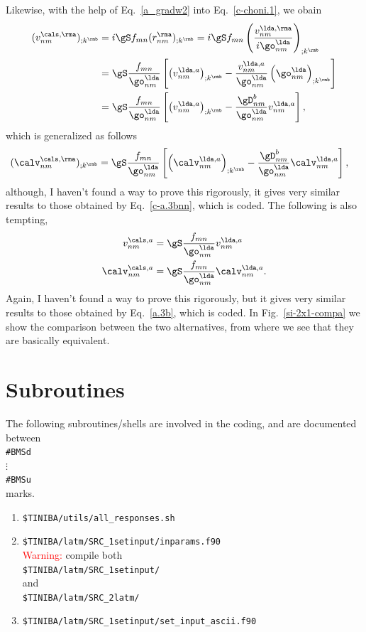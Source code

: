 Likewise, with the help
of Eq.~\eqref{a_gradw2} into
Eq.~\eqref{c-choni.1}, we obain
\begin{align}\label{ccu54}
(v^{\cals,\rma}_{nm})_{;k^\rmb}&=
i\gS f_{mn}(r^\rma_{nm})_{;k^\rmb}
=
i\gS f_{mn}\left(\frac{v^{\lda,\rma}_{nm}}{i\go^\lda_{nm}}\right)_{;k^\rmb}
\nonumber\\
&=
\gS\frac{f_{mn}}{\go^\lda_{nm}}\left[
\left(v^{\lda,a}_{nm}\right)_{;k^\rmb}
-
\frac{v^{\lda,a}_{nm}}{\go^\lda_{nm}}\left(\go^\lda_{nm}\right)_{;k^\rmb}
\right]
\nonumber\\
&=
\gS\frac{f_{mn}}{\go^\lda_{nm}}\left[
\left(v^{\lda,a}_{nm}\right)_{;k^\rmb}
-
\frac{\gD^{b}_{nm}}{\go^\lda_{nm}}v^{\lda,a}_{nm}
\right]
,
\end{align}
which is generalized as follows 
\begin{align}\label{ccu55}
(\calv^{\cals,\rma}_{nm})_{;k^\rmb}&=
\gS\frac{f_{mn}}{\go^\lda_{nm}}\left[
\left(\calv^{\lda,a}_{nm}\right)_{;k^\rmb}
-
\frac{\gD^{b}_{nm}}{\go^\lda_{nm}}\calv^{\lda,a}_{nm}
\right]
,
\end{align}
although, I haven't found a way to prove this rigorously, it gives 
very similar results to those obtained by Eq.~\eqref{c-a.3bnn}, which 
is coded. 
The following is also tempting,
\begin{align}\label{temp.1}
v^{\cals,a}_{nm}
&=\gS\frac{f_{mn}}{\go^\lda_{nm}}
v^{\lda,a}_{nm}
\nonumber\\
\calv^{\cals,a}_{nm}
&=\gS\frac{f_{mn}}{\go^\lda_{nm}}
\calv^{\lda,a}_{nm}
.
\end{align}
Again, I haven't found a way to prove this rigorously, but it gives 
very similar results to those obtained by Eq.~\eqref{a.3b}, which 
is coded. In Fig.~\ref{si-2x1-compa} we show the comparison between
the two alternatives, from where we see that they are basically equivalent. 



\section{Subroutines}

The following subroutines/shells are involved in the coding,
and are documented between\\
\verb=#BMSd=\\
$\vdots$\\
\verb=#BMSu=\\
marks.
\begin{enumerate}
\item \verb=$TINIBA/utils/all_responses.sh=
\item \verb=$TINIBA/latm/SRC_1setinput/inparams.f90=\\
\textcolor{red}{Warning:} compile both\\
\verb=$TINIBA/latm/SRC_1setinput/= \\
and\\
\verb=$TINIBA/latm/SRC_2latm/= 
\item \verb=$TINIBA/latm/SRC_1setinput/set_input_ascii.f90=\\
\end{enumerate}

